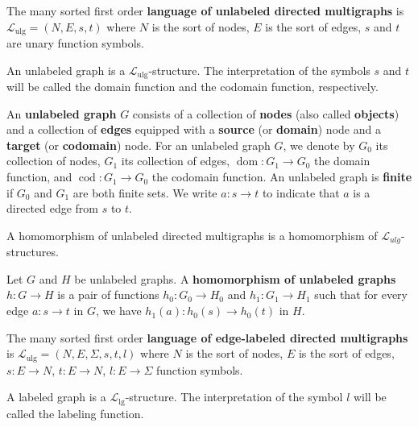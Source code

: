 \begin{definition}
    \label{def:l_ulg}
    The many sorted first order \textbf{language of unlabeled directed multigraphs} is $\mathcal{L}_\text{ulg} = (N,E,s,t)$ where $N$ is the sort of nodes, $E$ is the sort of edges, $s$ and $t$ are unary function symbols.
  \end{definition}
\begin{definition}
    \label{def:ulg}
    An unlabeled graph is a $\mathcal{L}_\text{ulg}$-structure. The interpretation of the symbols $s$ and $t$ will be called the domain function and the codomain function, respectively.
\end{definition}
An \textbf{unlabeled graph} \( G \) consists of a collection of \textbf{nodes} (also called \textbf{objects}) and a collection of \textbf{edges} equipped with a \textbf{source} (or \textbf{domain}) node and a \textbf{target} (or \textbf{codomain}) node. 
For an unlabeled graph \( G \), we denote by \( G_0 \) its collection of nodes, \( G_1 \) its collection of edges, \( \operatorname{dom}:G_1{\to}G_0 \) the domain function, and \( \operatorname{cod}:G_1{\to}G_0 \) the codomain function. An unlabeled graph is \textbf{finite} if \( G_0 \) and \( G_1 \) are both finite sets.
We write \( a: s \to t \) to indicate that \( a \) is a directed edge from \( s \) to \( t \).
\begin{definition}
    \label{def:homomorphism_ulg}
    A homomorphism of unlabeled directed multigraphs is a homomorphism of $\mathcal{L}_{ulg}$-structures.
\end{definition}
Let \( G \) and \( H \) be unlabeled graphs. A \textbf{homomorphism of unlabeled graphs} \( h: G \to H \) is a pair of functions \( h_0: G_0 \to H_0 \) and \( h_1: G_1 \to H_1 \) such that for every edge \( a: s \to t \) in \( G \), we have \( h_1(a) : h_0(s) \to h_0(t) \) in \( H \).
\begin{definition}
    \label{def:l_lg}
    The many sorted first order \textbf{language of edge-labeled directed multigraphs} is $\mathcal{L}_\text{ulg} = (N,E,\Sigma, s,t,l)$ where $N$ is the sort of nodes, $E$ is the sort of edges, $s:E \to N$, $t: E \to N$, $l:E \to \Sigma$ function symbols.
  \end{definition}
\begin{definition}
    \label{def:lg}
    A labeled graph is a $\mathcal{L}_\text{lg}$-structure. The interpretation of the symbol $l$ will be called the labeling function.
\end{definition}

